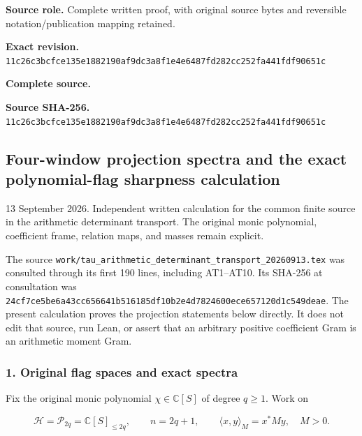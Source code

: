 \documentclass{article}
\begin{document}
\maketitle
\begingroup
\sloppy
\small

\noindent\textbf{Source role.} Complete written proof, with original source bytes and reversible notation/publication mapping retained.\par
\noindent\textbf{Exact revision.} \nolinkurl{11c26c3bcfce135e1882190af9dc3a8f1e4e6487fd282cc252fa441fdf90651c}\par
\noindent\textbf{Complete source.} \par
\noindent\textbf{Source SHA-256.} \nolinkurl{11c26c3bcfce135e1882190af9dc3a8f1e4e6487fd282cc252fa441fdf90651c}\par\medskip
\subsection{Four-window projection spectra and the exact polynomial-flag sharpness calculation}\label{endpoint-four_window_sharpness--four-window-projection-spectra-and-the-exact-polynomial-flag-sharpness-calculation}

13 September 2026. Independent written calculation for the common finite source in the arithmetic determinant transport. The original monic polynomial, coefficient frame, relation maps, and masses remain explicit.

The source \nolinkurl{work/tau_arithmetic_determinant_transport_20260913.tex} was consulted through its first 190 lines, including AT1--AT10. Its SHA-256 at consultation was \nolinkurl{24cf7ce5be6a43cc656641b516185df10b2e4d7824600ece657120d1c549deae}. The present calculation proves the projection statements below directly. It does not edit that source, run Lean, or assert that an arbitrary positive coefficient Gram is an arithmetic moment Gram.

\subsubsection{1. Original flag spaces and exact spectra}\label{endpoint-four_window_sharpness--original-flag-spaces-and-exact-spectra}

Fix the original monic polynomial \(\chi\in\mathbb C[S]\) of degree \(q\ge1\). Work on

\[
\mathcal H=\mathcal P_{2q}=\mathbb C[S]_{\le2q},\qquad n=2q+1,
\qquad \langle x,y\rangle_M=x^*My,
\quad M>0.
\tag{FS1}
\]
\end{document}
